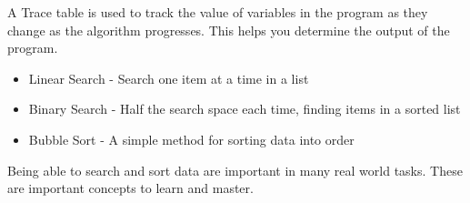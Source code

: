 \documentclass[12pt,a4paper, pink]{bbe}
\begin{document}
  \begin{tracetable}
    A Trace table is used to track the value of variables in the program as they change as the algorithm progresses. This helps you determine the output of the program.
  \end{tracetable}
  
  \begin{recap}
  \vspace{5mm}
	\begin{itemize}[c]
	    \item Linear Search - Search one item at a time in a list
	    \item Binary Search - Half the search space each time, finding items in a sorted list
	    \item Bubble Sort - A simple method for sorting data into order
	    
	\end{itemize}
	
	   Being able to search and sort data are important in many real world tasks. These are important concepts to learn and master.
	\end{recap}
  
\end{document}
